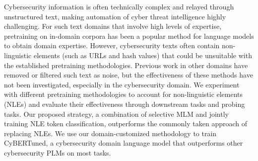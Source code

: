 Cybersecurity information is often technically complex and relayed through unstructured text, making automation of cyber threat intelligence highly challenging. For such text domains that involve high levels of expertise, pretraining on in-domain corpora has been a popular method for language models to obtain domain expertise. However, cybersecurity texts often contain non-linguistic elements (such as URLs and hash values) that could be unsuitable with the established pretraining methodologies. Previous work in other domains have removed or filtered such text as noise, but the effectiveness of these methods have not been investigated, especially in the cybersecurity domain. We experiment with different pretraining methodologies to account for non-linguistic elements (NLEs) and evaluate their effectiveness through downstream tasks and probing tasks. Our proposed strategy, a combination of selective MLM and jointly training NLE token classification, outperforms the commonly taken approach of replacing NLEs. We use our domain-customized methodology to train CyBERTuned, a cybersecurity domain language model that outperforms other cybersecurity PLMs on most tasks.